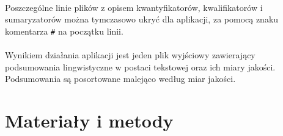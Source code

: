\documentclass{classrep}
\begin{document}
\paragraph{}
Poszczególne linie plików z opisem kwantyfikatorów, kwalifikatorów i sumaryzatorów można tymczasowo ukryć dla aplikacji, za pomocą znaku komentarza \verb|#| na początku linii.

\paragraph{}
Wynikiem działania aplikacji jest jeden plik wyjściowy zawierający podsumowania lingwistyczne w postaci tekstowej oraz ich miary jakości. Podsumowania są posortowane malejąco według miar jakości.

\section{Materiały i metody}
\end{document}
